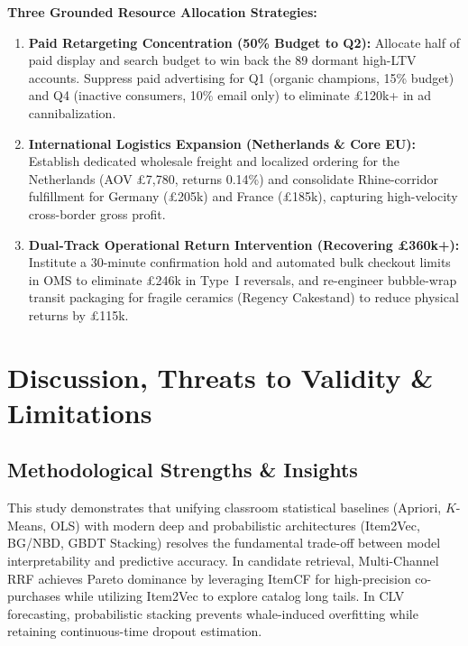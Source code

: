 \documentclass[sigconf,nonacm]{acmart}
\begin{document}
\textbf{Three Grounded Resource Allocation Strategies:}
\begin{enumerate}
    \item \textbf{Paid Retargeting Concentration (50\% Budget to Q2):} Allocate half of paid display and search budget to win back the 89 dormant high-LTV accounts. Suppress paid advertising for Q1 (organic champions, 15\% budget) and Q4 (inactive consumers, 10\% email only) to eliminate £120k+ in ad cannibalization.
    \item \textbf{International Logistics Expansion (Netherlands \& Core EU):} Establish dedicated wholesale freight and localized ordering for the Netherlands (AOV £7,780, returns 0.14\%) and consolidate Rhine-corridor fulfillment for Germany (£205k) and France (£185k), capturing high-velocity cross-border gross profit.
    \item \textbf{Dual-Track Operational Return Intervention (Recovering £360k+):} Institute a 30-minute confirmation hold and automated bulk checkout limits in OMS to eliminate £246k in Type~I reversals, and re-engineer bubble-wrap transit packaging for fragile ceramics (Regency Cakestand) to reduce physical returns by £115k.
\end{enumerate}

\section{Discussion, Threats to Validity \& Limitations}

\subsection{Methodological Strengths \& Insights}
This study demonstrates that unifying classroom statistical baselines (Apriori, $K$-Means, OLS) with modern deep and probabilistic architectures (Item2Vec, BG/NBD, GBDT Stacking) resolves the fundamental trade-off between model interpretability and predictive accuracy. In candidate retrieval, Multi-Channel RRF achieves Pareto dominance by leveraging ItemCF for high-precision co-purchases while utilizing Item2Vec to explore catalog long tails. In CLV forecasting, probabilistic stacking prevents whale-induced overfitting while retaining continuous-time dropout estimation.
\end{document}
